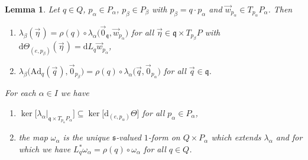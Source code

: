 \documentclass[11pt]{article}
\numberwithin{equation}{section}
\newtheorem{Lemma}[Theorem]{Lemma}
\newcommand{\Add}[1]{\mathrm{Ad}_{#1}}
\begin{document}
\begin{Lemma}
\label{lemma:lambda}
Let $q\in Q$, $p_\alpha\in P_\alpha$, $p_\beta\in P_\beta$ with $p_\beta=q\cdot p_\alpha$ and $\vec{w}_{p_\alpha}\in
T_{p_\alpha}P_\alpha$.
Then
\begin{enumerate}\itemsep=0pt
\item[$1)$]
$\lambda_\beta(\vec{\eta}\hspace{1pt})=\rho(q)\circ \lambda_\alpha\big(\vec{0}_{\mathfrak{q}},\vec{w}_{p_\alpha}\big)$ for all
$\vec{\eta}\in \mathfrak{q}\times T_{p_\beta}P$ with $\mathrm{d}\Theta_{(e,p_\beta)}(\vec{\eta}\hspace{1pt})=\mathrm{d}
L_q\vec{w}_{p_\alpha}$,
\item[$2)$]
$\lambda_\beta\big(\Add{q}(\vec{q}\hspace{1pt}),\vec{0}_{p_\beta}\big)=\rho(q)\circ
\lambda_\alpha\big(\vec{q},\vec{0}_{p_\alpha}\big)$ for all $\vec{q}\in \mathfrak{q}$.
\end{enumerate}
For each $\alpha \in I$ we have
\begin{enumerate}\itemsep=0pt
\item[$3)$] $\ker\big[\lambda_\alpha|_{\mathfrak{q}\times T_{p_\alpha}P_\alpha}\big]\subseteq
\ker\big[\mathrm{d}_{(e,p_\alpha)}\Theta\big]$ for all $p_\alpha\in P_\alpha$,
\item[$4)$] the map $\omega_\alpha$ is
the unique $\mathfrak{s}$-valued $1$-form on $Q\times P_\alpha$ which extends $\lambda_\alpha$ and for which we have
$L_q^{*}\omega_\alpha=\rho(q)\circ \omega_\alpha$ for all $q\in Q$.
\end{enumerate}
\end{Lemma}
\end{document}
